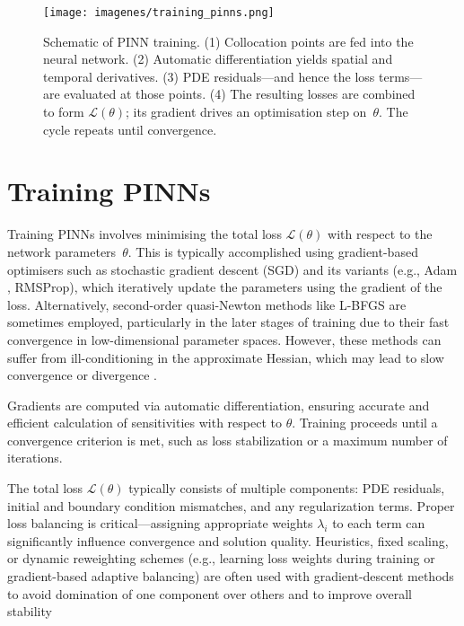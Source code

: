 \documentclass[12pt]{report} %
\theoremstyle{plain} %
\theoremstyle{definition} %
\theoremstyle{remark} %
\begin{document}
\begin{figure}
 \centering
 \texttt{[image: imagenes/training\_pinns.png]}
 \caption{Schematic of PINN training. 
 (1) Collocation points are fed into the neural network. 
 (2) Automatic differentiation yields spatial and temporal derivatives. 
 (3) PDE residuals—and hence the loss terms—are evaluated at those points. 
 (4) The resulting losses are combined to form $\mathcal{L}(\theta)$; its
 gradient drives an optimisation step on~$\theta$. The cycle repeats until
 convergence.}
 \label{fig:pinns_training}
\end{figure}

\section{Training PINNs}

Training PINNs involves minimising the total loss $\mathcal{L}(\theta)$ with respect to the network 
parameters~$\theta$. This is typically accomplished using gradient-based optimisers such as 
stochastic gradient descent (SGD) and its variants (e.g., Adam \cite{kingma2017adammethodstochasticoptimization}, RMSProp), which iteratively 
update the parameters using the gradient of the loss. Alternatively, second-order quasi-Newton 
methods like L-BFGS are sometimes employed, particularly in the later stages of training due to their fast 
convergence in low-dimensional parameter spaces. However, these methods can suffer from ill-conditioning in 
the approximate Hessian, which may lead to slow convergence or divergence \cite{Urb_n_2025}.

Gradients are computed via automatic differentiation, ensuring accurate and efficient calculation of sensitivities with 
respect to $\theta$. Training proceeds until a convergence criterion is met, such as loss stabilization or a maximum number of iterations.

The total loss $\mathcal{L}(\theta)$ typically consists of multiple components: PDE residuals, initial and boundary 
condition mismatches, and any regularization terms. Proper loss balancing is critical—assigning appropriate weights $\lambda_i$ 
to each term can significantly influence convergence and solution quality. Heuristics, fixed scaling, or dynamic 
reweighting schemes (e.g., learning loss weights during training or gradient-based adaptive balancing) are often 
used with gradient-descent methods to avoid domination of one component over others and to improve overall stability \cite{XIANG202211}
\end{document}

